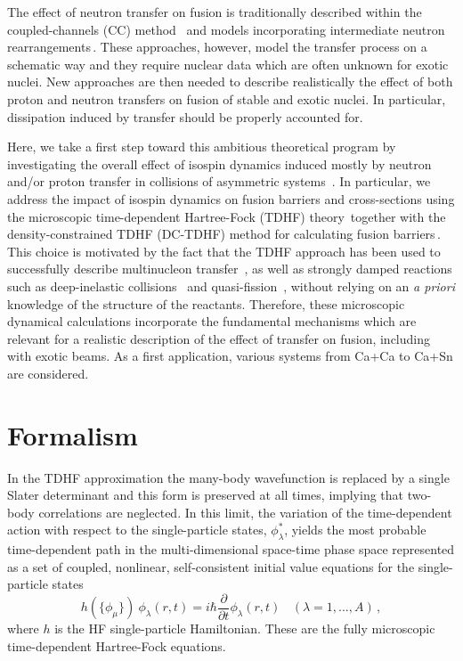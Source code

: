 The effect of neutron transfer on fusion is traditionally described  within the coupled-channels (CC) method~\citep{rowley1992,esbensen1998,hagino2012}
and models incorporating intermediate neutron
rearrangements\,\citep{zagrebaev2003,zagrebaev2007c,karpov2015}.
These approaches, however, model the transfer process on a schematic way
and they require nuclear data which are often unknown for exotic nuclei.
New approaches are then needed to describe realistically the effect of both proton and neutron transfers on fusion of stable and exotic nuclei.
In particular, dissipation induced by transfer should be properly accounted for.

Here, we take a first step toward this ambitious theoretical program by investigating the overall effect of isospin dynamics induced mostly by neutron and/or proton transfer in collisions of asymmetric systems~\citep{dasso1985,chomaz1993,baran1996,baran2001,simenel2001,baran2005,simenel2007,baran2009,oberacker2012,umar2008a}.
In particular, we address the impact of isospin dynamics on fusion barriers and cross-sections using
the microscopic
time-dependent Hartree-Fock (TDHF) theory\,\citep{negele1982,simenel2012}
together with the density-constrained TDHF (DC-TDHF) method for calculating fusion barriers\,\citep{umar2006b}.
This choice is motivated by the fact that the TDHF approach has been used to successfully describe multinucleon transfer~\citep{simenel2010,simenel2012b,sekizawa2013,scamps2013a,bourgin2016}, as well as strongly damped reactions such as deep-inelastic collisions~\citep{koonin1977,simenel2011} and quasi-fission~\citep{wakhle2014,umar2015a,umar2016}, without relying on an {\it a priori} knowledge of the structure of the reactants.
Therefore, these microscopic dynamical calculations incorporate the fundamental mechanisms which are relevant for a realistic description of the effect of transfer on fusion, including with exotic beams.
As a first application, various systems from Ca+Ca to Ca+Sn are considered.

\section{Formalism}

In the TDHF approximation the many-body wavefunction is replaced by a single
Slater determinant and this form is preserved at all times, implying that two-body correlations
are neglected.
In this limit, the
variation of the time-dependent action with respect to the single-particle states, $\phi^{*}_{\lambda}$, yields the most probable time-dependent path
in the multi-dimensional space-time phase space
represented as a
set of coupled, nonlinear, self-consistent initial value equations
for the single-particle states
\begin{equation}
h(\{\phi_{\mu}\}) \ \phi_{\lambda} (r,t) = i \hbar \frac{\partial}{\partial t} \phi_{\lambda} (r,t)
\ \ \ \ (\lambda = 1,...,A)\,,
\end{equation}
where $h$ is the HF single-particle Hamiltonian.
These are the fully microscopic time-dependent Hartree-Fock equations.

